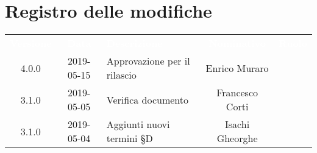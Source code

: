 
\section*{Registro delle modifiche}
{
	\renewcommand{\arraystretch}{1.5}
	\centering
	\begin{longtable}{ c c  C{4cm}  c  c }
		
		\textcolor{white}{\textbf{Versione}} & \textcolor{white}{\textbf{Data}} & \textcolor{white}{\textbf{Descrizione}} & \textcolor{white}{\textbf{Nominativo}} & \textcolor{white}{\textbf{Ruolo}}\\
		
		4.0.0 & 2019-05-15 & Approvazione per il rilascio & Enrico Muraro & \Res{}\\
		
		3.1.0 & 2019-05-05 & Verifica documento & Francesco Corti &\ver{}\\
		
		3.1.0 & 2019-05-04 & Aggiunti nuovi termini \S{D} & Isachi Gheorghe &\reda{}\\		
		
	\end{longtable}

}